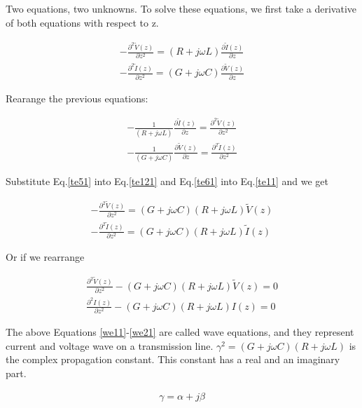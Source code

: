 \documentclass{ximera}
\begin{document}
Two equations, two unknowns. To solve these equations, we first
take a derivative of both equations with respect to z. 

\begin{eqnarray}
-\frac{\partial^2 \tilde{V}(z)}{\partial z^2}=  (R+j\omega L) \frac{\partial
 \tilde{I}(z)}{\partial z}  \label{teleg3} \\
-\frac{\partial^2 \tilde{I}(z)}{\partial z^2}=  (G+j\omega C) \frac{\partial
 \tilde{V}(z)}{\partial z} \label{teleg4}
\end{eqnarray}

Rearange the previous equations:



\begin{eqnarray}
- \frac{1}{ (R+j\omega L)} \frac{\partial \tilde{I}(z)}{\partial z}= \frac{\partial^2
  \tilde{V}(z)}{\partial z^2} \label{te51} \\
-\frac{1}{ (G+j\omega C)} \frac{\partial \tilde{V}(z)}{\partial z}= \frac{\partial^2
  \tilde{I}(z)}{\partial z^2} \label{te61}
\end{eqnarray}

Substitute  Eq.\ref{te51} into  Eq.\ref{te121}
and Eq.\ref{te61} into Eq.\ref{te11} and we get

\begin{eqnarray}
-\frac{\partial^2 \tilde{V}(z)}{\partial z^2}=(G+j\omega C)(R+j\omega L) \tilde{V}(z) \label{teleg1} \\
-\frac{\partial^2 \tilde{I}(z)}{\partial z^2}= (G+j\omega C)  (R+j\omega L) \label{teleg2}
\tilde{I}(z) 
\end{eqnarray}

Or if we rearrange


\begin{eqnarray}
\frac{\partial^2 \tilde{V}(z)}{\partial z^2} -(G+j\omega C)(R+j\omega L)
 \tilde{V}(z)=0  \label{we11} \\ 
\frac{\partial^2 I(z)}{\partial z^2}- (G+j\omega C)  (R+j\omega L)
I(z)=0 \label{we21}
\end{eqnarray}

The above Equations \ref{we11}-\ref{we21} are called wave equations, and they represent
current and voltage wave on a transmission line. 
 $\gamma^2=(G+j\omega
C)(R+j\omega L)$ is the complex propagation constant. This constant
has a real and an imaginary part.

\begin{eqnarray}
\gamma= \alpha + j \beta \nonumber
\end{eqnarray}
\end{document}
